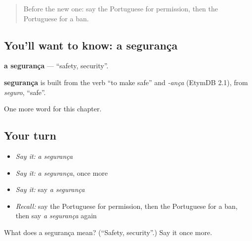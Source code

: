 \begin{quote}
Before the new one: say the Portuguese for permission, then the Portuguese for a ban.
\end{quote}

\subsection*{You'll want to know: a segurança}
\textbf{a segurança} — \textquotedblleft{}safety, security\textquotedblright{}.

\begin{cousinweb}
\textbf{segurança} is built from the verb \textquotedblleft{}to make safe\textquotedblright{} and \emph{-ança} (EtymDB 2.1), from \emph{seguro}, \textquotedblleft{}safe\textquotedblright{}.
\end{cousinweb}

\begin{grammarlens}[title={What you've built}]
One more word for this chapter.
\end{grammarlens}

\subsection*{Your turn}
\begin{itemize}
\raggedright
  \item \emph{Say it:} \emph{a segurança}
  \item \emph{Say it:} \emph{a segurança}, once more
  \item \emph{Say it:} say \emph{a segurança}
  \item \emph{Recall:} say the Portuguese for permission, then the Portuguese for a ban, then say \emph{a segurança} again
\end{itemize}

\begin{tcolorbox}[breakable,colback=teal!4,colframe=teal!35!black,title={Before you move on}]
What does a segurança mean? (\textquotedblleft{}Safety, security\textquotedblright{}.) Say it once more.
\end{tcolorbox}
